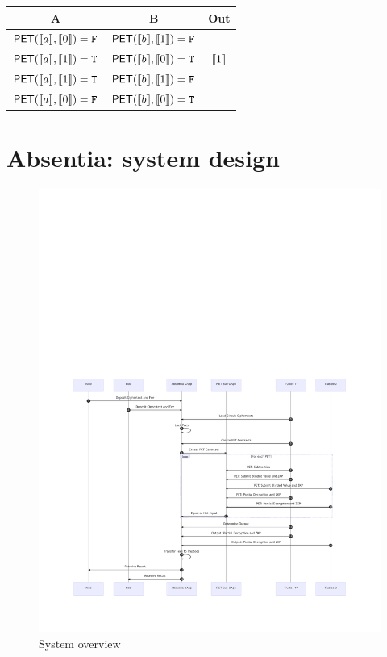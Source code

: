 \begin{center}
\begin{tabular}{|c|c|c|}
  \hline
  A			& 	B			& 	Out   			\\ \hline
  $\mathsf{PET}(\llbracket a \rrbracket,\llbracket 0 \rrbracket) = \mathtt{F}$ 	&	$\mathsf{PET}(\llbracket b \rrbracket,\llbracket 1 \rrbracket) = \mathtt{F}$ 	& 	 		\\ \hline
  $\mathsf{PET}(\llbracket a \rrbracket,\llbracket 1 \rrbracket) = \mathtt{T}$ 	&	$\mathsf{PET}(\llbracket b \rrbracket,\llbracket 0 \rrbracket) = \mathtt{T}$ 	&  $\llbracket 1 \rrbracket$  	\\ \hline
  $\mathsf{PET}(\llbracket a \rrbracket,\llbracket 1 \rrbracket) = \mathtt{T}$ 	&	$\mathsf{PET}(\llbracket b \rrbracket,\llbracket 1 \rrbracket) = \mathtt{F}$ 	&  	 		\\ \hline
  $\mathsf{PET}(\llbracket a \rrbracket,\llbracket 0 \rrbracket) = \mathtt{F}$ 	&	$\mathsf{PET}(\llbracket b \rrbracket,\llbracket 0 \rrbracket) = \mathtt{T}$ 	& 	 		\\ \hline
\end{tabular}
\end{center}


\section{Absentia: system design}
\label{sec:system}

\begin{figure}[h]
	\includegraphics[width=1\textwidth]{figures/abstentia.pdf}
	\caption{System overview}
	\centering
	\label{fig:system}
\end{figure}

